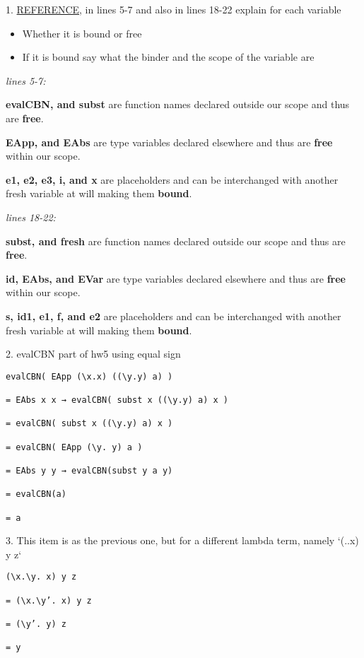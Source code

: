 \documentclass{article}
\theoremstyle{theorem}
\theoremstyle{definition}
\theoremstyle{remark}
\begin{document}
1. \href{https://github.com/alexhkurz/programming-languages-2022/blob/main/src/LambdaNat0/src/Interpreter-fragment.hs}{REFERENCE}, in lines 5-7 and also in lines 18-22 explain for each variable
\begin{itemize}
\item   Whether it is bound or free
\item   If it is bound say what  the binder and the scope of the variable are
\end{itemize}

\textit{lines 5-7:}

\textbf{evalCBN, and subst} are function names declared outside our scope and thus are \textbf{free}.

\textbf{EApp, and EAbs} are type variables declared elsewhere and thus are \textbf{free} within our scope. 

\textbf{e1, e2, e3, i, and x} are placeholders and can be interchanged with another fresh variable at will making them \textbf{bound}.

\textit{lines 18-22:}

\textbf{subst, and fresh} are function names declared outside our scope and thus are \textbf{free}.

\textbf{id, EAbs, and EVar} are type variables declared elsewhere and thus are \textbf{free} within our scope. 

\textbf{s, id1, e1, f, and e2} are placeholders and can be interchanged with another fresh variable at will making them \textbf{bound}.

2. evalCBN part of hw5 using equal sign
\begin{verbatim}
evalCBN( EApp (\x.x) ((\y.y) a) )

= EAbs x x → evalCBN( subst x ((\y.y) a) x )

= evalCBN( subst x ((\y.y) a) x )

= evalCBN( EApp (\y. y) a )

= EAbs y y → evalCBN(subst y a y)

= evalCBN(a)

= a
\end{verbatim}

3. This item is as the previous one, but for a different lambda term, namely `(\x.\y.x) y z`

\begin{verbatim}
(\x.\y. x) y z

= (\x.\y’. x) y z

= (\y’. y) z

= y
\end{verbatim}
\end{document}
